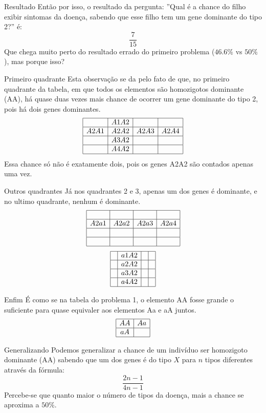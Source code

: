 \documentclass{beamer}
\begin{document}
\begin{frame}{Resultado}
	Então por isso, o resultado da pergunta: ''Qual é a chance do filho exibir sintomas da doença, sabendo que esse filho tem um gene dominante do tipo 2?'' é:
	\[ \dfrac{7}{15} \]
	Que chega muito perto do resultado errado do primeiro problema ($46.6\%$ vs $50\%$), mas porque isso?
\end{frame}

\begin{frame}{Primeiro quadrante}
	Esta observação se da pelo fato de que, no primeiro quadrante da tabela, em que todos os elementos são homozigotos dominante (AA), há quase duas vezes mais chance de ocorrer um gene dominante do tipo 2, pois há dois genes dominantes.
	\[  \begin{array}{|c|c|c|c|}
		\hline
		& A1A2 &&\\ 
		\hline
		A2A1 & A2A2 & A2A3 & A2A4\\ 
		\hline
		& A3A2 &&\\ 
		\hline
		& A4A2 &&\\  
		\hline
	\end{array}\]
	Essa chance só não é exatamente dois, pois os genes A2A2 são contados apenas uma vez.
\end{frame}

\begin{frame}{Outros quadrantes}
		Já nos quadrantes 2 e 3, apenas um dos genes é dominante, e no ultimo quadrante, nenhum é dominante.
		\[	\begin{array}{|c|c|c|c|}
			\hline
			&&&\\ 
			\hline
			A2a1 & A2a2 & A2a3 & A2a4\\ 
			\hline
			&&&\\ 
			\hline
			&&&\\ 
			\hline
		\end{array}\]
		\[  \begin{array}{|c|c|c|c|}
			\hline
			& a1A2 &&\\ 
			\hline
			& a2A2 &&\\ 
			\hline
			& a3A2 &&\\ 
			\hline
			& a4A2 &&\\ 
			\hline
			\end{array}\]		
\end{frame}

\begin{frame}{Enfim}
	É como se na tabela do problema 1, o elemento AA fosse grande o suficiente para quase equivaler aos elementos Aa e aA juntos. 
	\[\begin{array}{|c|c|}
		\hline
		\Huge{AA} & Aa\\
		\hline
		aA &\\
		\hline
	\end{array}
	\]
\end{frame}

\begin{frame}{Generalizando}
	Podemos generalizar a chance de um indivíduo ser homozigoto dominante (AA) sabendo que um dos genes é do tipo $X$ para $n$ tipos diferentes através da fórmula:
	\[\dfrac{2n - 1}{4n - 1}\]
	Percebe-se que quanto maior o número de tipos da doença, mais a chance se aproxima a $50\%$.
\end{frame}
\end{document}
